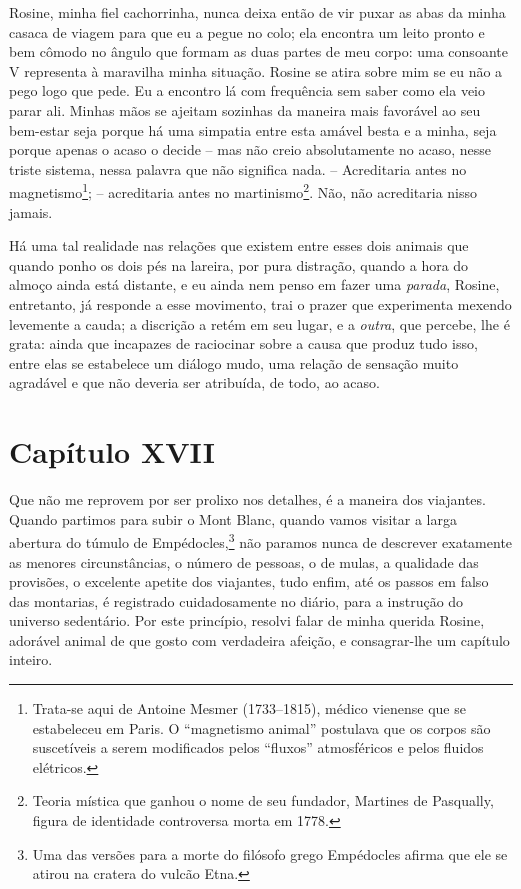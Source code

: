  Rosine, minha fiel cachorrinha, nunca deixa então de vir puxar as abas
da minha casaca de viagem para que eu a pegue no colo; ela encontra um
leito pronto e bem cômodo no ângulo que formam as duas partes de meu
corpo: uma consoante V representa à maravilha minha situação. Rosine se
atira sobre mim se eu não a pego logo que pede. Eu a encontro lá com
frequência sem saber como ela veio parar ali. Minhas mãos se ajeitam
sozinhas da maneira mais favorável ao seu bem-estar seja porque há uma
simpatia entre esta amável besta e a minha, seja porque apenas o acaso
o decide -- mas não creio absolutamente no acaso, nesse triste
sistema, nessa palavra que não significa nada. -- Acreditaria antes no
magnetismo\footnote{ Trata-se aqui de Antoine Mesmer (1733--1815),
médico vienense que se estabeleceu em Paris. O ``magnetismo animal''
postulava que os corpos são suscetíveis a serem modificados pelos
``fluxos'' atmosféricos e pelos fluidos elétricos.}; -- acreditaria
antes no martinismo\footnote{ Teoria mística que ganhou o nome de seu
fundador, Martines de Pasqually, figura de identidade controversa morta
em 1778.}. Não, não acreditaria nisso jamais. 

 Há uma tal realidade nas relações que existem entre esses dois animais
que quando ponho os dois pés na lareira, por pura distração, quando a
hora do almoço ainda está distante, e eu ainda nem penso em fazer uma
\textit{parada}, Rosine, entretanto, já responde a esse movimento, trai
o prazer que experimenta mexendo levemente a cauda; a discrição a retém
em seu lugar, e a \textit{outra}, que percebe, lhe é grata: ainda que
incapazes de raciocinar sobre a causa que produz tudo isso, entre elas
se estabelece um diálogo mudo, uma relação de sensação muito agradável
e que não deveria ser atribuída, de todo, ao acaso. 

\section*{Capítulo XVII}

 Que não me reprovem por ser prolixo nos detalhes, é a maneira dos
viajantes. Quando partimos para subir o Mont Blanc, quando vamos
visitar a larga abertura do túmulo de Empédocles,\footnote{ Uma das
versões para a morte do filósofo grego Empédocles afirma que ele se
atirou na cratera do vulcão Etna.} não paramos nunca de descrever
exatamente as menores circunstâncias, o número de pessoas, o de mulas,
a qualidade das provisões, o excelente apetite dos viajantes, tudo
enfim, até os passos em falso das montarias, é registrado
cuidadosamente no diário, para a instrução do universo sedentário. Por
este princípio, resolvi falar de minha querida Rosine, adorável animal
de que gosto com verdadeira afeição, e consagrar-lhe um capítulo
inteiro. 

